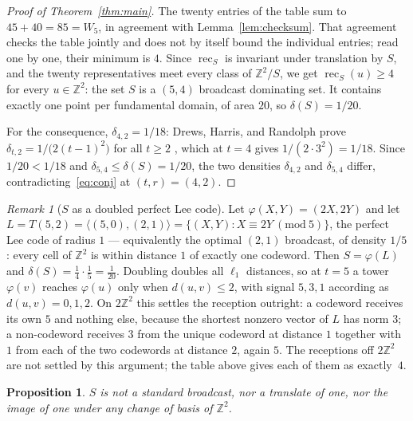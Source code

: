 \documentclass[11pt]{amsart}
\newtheorem{proposition}[theorem]{Proposition}
\theoremstyle{remark}
\newtheorem*{remark}{Remark}
\newcommand{\ZZ}{\mathbb{Z}}
\newcommand{\dens}{\delta}
\newcommand{\rec}{\operatorname{rec}}
\newcommand{\Tstd}{T}
\begin{document}
\begin{proof}[Proof of Theorem~\ref{thm:main}]
The twenty entries of the table sum to $45+40=85=W_5$, in agreement with
Lemma~\ref{lem:checksum}. That agreement checks the table jointly and does not
by itself bound the individual entries; read one by one, their minimum is $4$.
Since $\rec_S$ is invariant under
translation by $S$, and the twenty representatives meet every class of
$\ZZ^2/S$, we get $\rec_S(u)\ge4$ for every $u\in\ZZ^2$: the set $S$ is a
$(5,4)$ broadcast dominating set. It contains exactly one point per fundamental
domain, of area $20$, so $\dens(S)=1/20$.

For the consequence, $\dens_{4,2}=1/18$: Drews, Harris, and Randolph prove
$\dens_{t,2}=1/\bigl(2(t-1)^2\bigr)$ for all $t\ge2$ \cite{DHR}, which at $t=4$
gives $1/(2\cdot3^2)=1/18$. Since
$1/20<1/18$ and $\dens_{5,4}\le\dens(S)=1/20$, the two densities
$\dens_{4,2}$ and $\dens_{5,4}$ differ, contradicting~\eqref{eq:conj} at
$(t,r)=(4,2)$.
\end{proof}

\begin{remark}[$S$ as a doubled perfect Lee code]
Let $\varphi(X,Y)=(2X,2Y)$ and let
$L=\Tstd(5,2)=\langle(5,0),(2,1)\rangle=\{(X,Y):X\equiv2Y\ (\mathrm{mod}\ 5)\}$,
the perfect Lee code of radius $1$ \cite{GW} --- equivalently the optimal $(2,1)$
broadcast, of density $1/5$: every cell of $\ZZ^2$ is within distance $1$ of
exactly one codeword. Then $S=\varphi(L)$ and
$\dens(S)=\tfrac14\cdot\tfrac15=\tfrac1{20}$. Doubling doubles all $\ell_1$
distances, so at $t=5$ a tower $\varphi(v)$ reaches $\varphi(u)$ only when
$d(u,v)\le2$, with signal $5,3,1$ according as $d(u,v)=0,1,2$. On $2\ZZ^2$ this
settles the reception outright: a codeword receives its own $5$ and nothing else,
because the shortest nonzero vector of $L$ has norm $3$; a non-codeword receives
$3$ from the unique codeword at distance $1$ together with $1$ from each of the
two codewords at distance $2$, again $5$. The receptions off $2\ZZ^2$ are not
settled by this argument; the table above gives each of them as exactly~$4$.
\end{remark}

\begin{proposition}\label{prop:nonstandard}
$S$ is not a standard broadcast, nor a translate of one, nor the image of one
under any change of basis of $\ZZ^2$.
\end{proposition}
\end{document}
